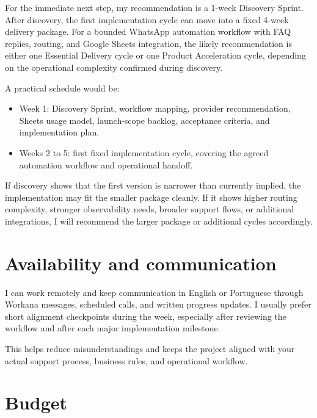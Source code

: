 \documentclass[11pt,a4paper]{article}
\begin{document}
For the immediate next step, my recommendation is a 1-week Discovery Sprint. After discovery, the first implementation cycle can move into a fixed 4-week delivery package. For a bounded WhatsApp automation workflow with FAQ replies, routing, and Google Sheets integration, the likely recommendation is either one Essential Delivery cycle or one Product Acceleration cycle, depending on the operational complexity confirmed during discovery.\par

A practical schedule would be:\par

\begin{itemize}
\item Week 1: Discovery Sprint, workflow mapping, provider recommendation, Sheets usage model, launch-scope backlog, acceptance criteria, and implementation plan.
\item Weeks 2 to 5: first fixed implementation cycle, covering the agreed automation workflow and operational handoff.
\end{itemize}

If discovery shows that the first version is narrower than currently implied, the implementation may fit the smaller package cleanly. If it shows higher routing complexity, stronger observability needs, broader support flows, or additional integrations, I will recommend the larger package or additional cycles accordingly.\par

\section*{Availability and communication}

I can work remotely and keep communication in English or Portuguese through Workana messages, scheduled calls, and written progress updates. I usually prefer short alignment checkpoints during the week, especially after reviewing the workflow and after each major implementation milestone.\par

This helps reduce misunderstandings and keeps the project aligned with your actual support process, business rules, and operational workflow.\par

\section*{Budget}
\end{document}
